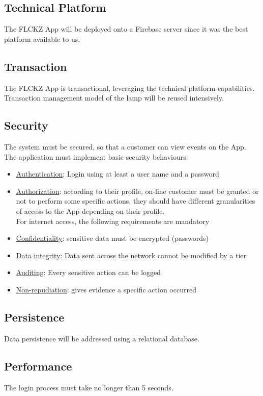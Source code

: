 \documentclass{article}
\begin{document}
\subsection{Technical Platform}

The FLCKZ App will be deployed onto a Firebase server since it was the best platform available to us.

\subsection{Transaction}
The FLCKZ App is transactional, leveraging the technical platform capabilities.
Transaction management model of the lamp will be reused intensively.

\subsection{Security}
The system must be secured, so that a customer can view events on the App.
The application must implement basic security behaviours:

\begin{itemize}
\item  \underline{Authentication}: Login using at least a user name and a password
\item \underline{Authorization}: according to their profile, on-line customer must be granted
or not to perform some specific actions, they should have different granularities of access to the App depending on their profile.\\
For internet access, the following requirements are mandatory
\item \underline{Confidentiality}: sensitive data must be encrypted (passwords)
\item \underline{Data integrity}: Data sent across the network cannot be modified by a
tier
\item \underline{Auditing}: Every sensitive action can be logged
\item \underline{Non-repudiation}: gives evidence a specific action occurred
\end{itemize}

\subsection{Persistence}
Data persistence will be addressed using a relational database.

\subsection{Performance}
The login process must take no longer than 5 seconds.
\end{document}
